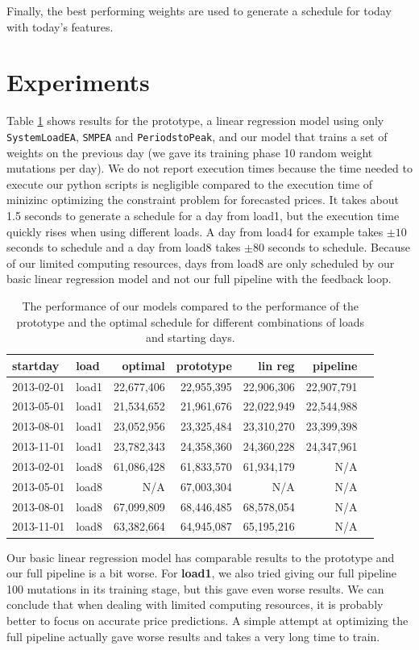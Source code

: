 \documentclass{article}
\begin{document}
Finally, the best performing weights are used to generate a schedule for today with today's features.

\section{Experiments}
Table \ref{tab:results} shows results for the prototype, a linear regression model using only \verb|SystemLoadEA|, \verb|SMPEA| and \verb|PeriodstoPeak|, and our model that trains a set of weights on the previous day (we gave its training phase 10 random weight mutations per day). We do not report execution times because the time needed to execute our python scripts is negligible compared to the execution time of minizinc optimizing the constraint problem for forecasted prices. It takes about 1.5 seconds to generate a schedule for a day from load1, but the execution time quickly rises when using different loads. A day from load4 for example takes $\pm 10$ seconds to schedule and a day from load8 takes $\pm 80$ seconds to schedule. Because of our limited computing resources, days from load8 are only scheduled by our basic linear regression model and not our full pipeline with the feedback loop.

\begin{table}
	\begin{tabular}{llrrrrr}
		startday & load &optimal & prototype & lin reg & pipeline \\ \midrule
		2013-02-01 & load1 & 22,677,406& 22,955,395 & 22,906,306 & 22,907,791\\
		2013-05-01 & load1 & 21,534,652& 21,961,676 & 22,022,949 & 22,544,988\\
		2013-08-01 & load1 & 23,052,956& 23,325,484 & 23,310,270 & 23,399,398\\
		2013-11-01 & load1 & 23,782,343& 24,358,360 & 24,360,228 & 24,347,961\\
		2013-02-01 & load8 & 61,086,428& 61,833,570 & 61,934,179 & N/A\\
		2013-05-01 & load8 & N/A& 67,003,304 & N/A & N/A\\
		2013-08-01 & load8 & 67,099,809& 68,446,485 & 68,578,054 & N/A\\
		2013-11-01 & load8 & 63,382,664& 64,945,087 & 65,195,216 & N/A\\
	\end{tabular}
	\caption{The performance of our models compared to the performance of the prototype and the optimal schedule for different combinations of loads and starting days.}
	\label{tab:results}
\end{table}
Our basic linear regression model has comparable results to the prototype and our full pipeline is a bit worse. For \textbf{load1}, we also tried giving our full pipeline 100 mutations in its training stage, but this gave even worse results.
We can conclude that when dealing with limited computing resources, it is probably better to focus on accurate price predictions. A simple attempt at optimizing the full pipeline actually gave worse results and takes a very long time to train. 
\end{document}
